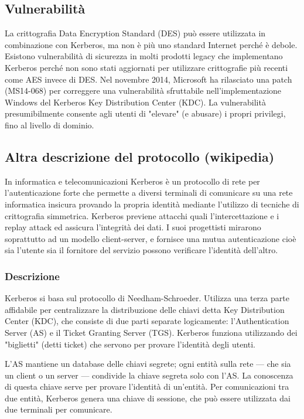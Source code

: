 \subsection{Vulnerabilità}
La crittografia Data Encryption Standard (DES) può essere utilizzata in combinazione con Kerberos, ma non è più uno standard Internet perché è debole. Esistono vulnerabilità di sicurezza in molti prodotti legacy che implementano Kerberos perché non sono stati aggiornati per utilizzare crittografie più recenti come AES invece di DES. Nel novembre 2014, Microsoft ha rilasciato una patch (MS14-068) per correggere una vulnerabilità sfruttabile nell'implementazione Windows del Kerberos Key Distribution Center (KDC). La vulnerabilità presumibilmente consente agli utenti di "elevare" (e abusare) i propri privilegi, fino al livello di dominio.
\subsection{Altra descrizione del protocollo (wikipedia)}
In informatica e telecomunicazioni Kerberos è un protocollo di rete per l'autenticazione forte che permette a diversi
terminali di comunicare su una rete informatica insicura provando la propria identità mediante l'utilizzo di tecniche
di crittografia simmetrica. Kerberos previene attacchi quali l'intercettazione e i replay attack ed assicura l'integrità
dei dati. I suoi progettisti mirarono soprattutto ad un modello client-server, e fornisce una mutua autenticazione
cioè sia l'utente sia il fornitore del servizio possono verificare l'identità dell'altro.
\subsubsection{Descrizione}
Kerberos si basa sul protocollo di Needham-Schroeder. Utilizza una terza parte affidabile per centralizzare la
distribuzione delle chiavi detta Key Distribution Center (KDC), che consiste di due parti separate logicamente:
l'Authentication Server (AS) e il Ticket Granting Server (TGS). Kerberos funziona utilizzando dei "biglietti" (detti
ticket) che servono per provare l'identità degli utenti.

\singlespacing

L'AS mantiene un database delle chiavi segrete; ogni entità sulla rete — che sia un client o un server — condivide
la chiave segreta solo con l'AS. La conoscenza di questa chiave serve per provare l'identità di un'entità. Per
comunicazioni tra due entità, Kerberos genera una chiave di sessione, che può essere utilizzata dai due terminali
per comunicare.

